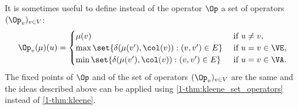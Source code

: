 \begin{remark}
It is sometimes useful to define instead of the operator $\Op$ a set of operators $(\Op_v)_{v \in V}$:
\[
\Op_v(\mu)(u) = 
\begin{cases}
\mu(v) & \text{ if } u \neq v, \\
\max \set{\delta( \mu(v'), \col(v)) : (v,v') \in E} & \text{ if } u = v \in \VE, \\
\min \set{\delta( \mu(v'), \col(v)) : (v,v') \in E} & \text{ if } u = v \in \VA.
\end{cases}
\]
The fixed points of $\Op$ and of the set of operators $(\Op_v)_{v \in V}$ are the same
and the ideas described above can be applied using \cref{1-thm:kleene_set_operators} instead of \cref{1-thm:kleene}.
\end{remark}
